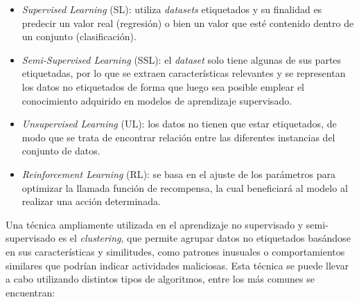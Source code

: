 \begin{itemize}
    \item \textit{Supervised Learning} (\gls{SL}): utiliza \textit{datasets} etiquetados y su finalidad es predecir un valor real (regresión) o bien un valor que esté contenido dentro de un conjunto (clasificación).

    \item \textit{Semi-Supervised Learning} (\gls{SSL}): el \textit{dataset} solo tiene algunas de sus partes etiquetadas, por lo que se extraen características relevantes y se representan los datos no etiquetados de forma que luego sea posible emplear el conocimiento adquirido en modelos de aprendizaje supervisado.

    \item \textit{Unsupervised Learning} (\gls{UL}): los datos no tienen que estar etiquetados, de modo que se trata de encontrar relación entre las diferentes instancias del conjunto de datos.

    \item \textit{Reinforcement Learning} (\gls{RL}): se basa en el ajuste de los parámetros para optimizar la llamada función de recompensa, la cual beneficiará al modelo al realizar una acción determinada.
\end{itemize}

Una técnica ampliamente utilizada en el aprendizaje no supervisado y semi-supervisado es el \textit{clustering}, que permite agrupar datos no etiquetados basándose en sus características y similitudes, como patrones inusuales o comportamientos similares que podrían indicar actividades maliciosas. Esta técnica se puede llevar a cabo utilizando distintos tipos de algoritmos, entre los más comunes se encuentran:


